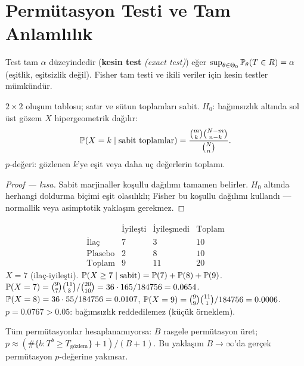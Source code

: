 \section{Permütasyon Testi ve Tam Anlamlılık}
\label{sec:tam_anlamlilik}

\begin{tanim}\label{def:tam_anlamlilik}
Test tam $\alpha$ düzeyindedir (\textbf{kesin test} \emph{(exact test)}) eğer $\sup_{\theta\in\Theta_0}\mathbb{P}_\theta(T\in R) = \alpha$ (eşitlik, eşitsizlik değil). Fisher tam testi ve ikili veriler için kesin testler mümkündür.
\end{tanim}

\begin{teorem}\label{thm:fisher_tam}
$2\times2$ oluşum tablosu; satır ve sütun toplamları sabit. $H_0$: bağımsızlık altında sol üst gözem $X$ hipergeometrik dağılır:
\[
  \mathbb{P}(X=k\mid\text{sabit toplamlar}) = \frac{\binom{m}{k}\binom{N-m}{n-k}}{\binom{N}{n}}.
\]
$p$-değeri: gözlenen $k$'ye eşit veya daha uç değerlerin toplamı.
\end{teorem}

\begin{proof}[Proof --- kısa]
Sabit marjinaller koşullu dağılımı tamamen belirler. $H_0$ altında herhangi doldurma biçimi eşit olasılıklı; Fisher bu koşullu dağılımı kullandı --- normallik veya asimptotik yaklaşım gerekmez.
\end{proof}

\begin{ornek}
\[
\begin{array}{c|cc|c}
 & \text{İyileşti} & \text{İyileşmedi} & \text{Toplam}\\\hline
\text{İlaç} & 7 & 3 & 10 \\
\text{Plasebo} & 2 & 8 & 10 \\\hline
\text{Toplam} & 9 & 11 & 20
\end{array}
\]
$X=7$ (ilaç-iyileşti). $\mathbb{P}(X\geq7\mid\text{sabit})=\mathbb{P}(7)+\mathbb{P}(8)+\mathbb{P}(9)$.
$\mathbb{P}(X=7)=\binom{9}{7}\binom{11}{3}/\binom{20}{10}=36\cdot165/184756=0.0654$.
$\mathbb{P}(X=8)=36\cdot55/184756=0.0107$, $\mathbb{P}(X=9)=\binom{9}{9}\binom{11}{1}/184756=0.0006$.
$p=0.0767>0.05$: bağımsızlık reddedilemez (küçük örneklem).
\end{ornek}

\begin{teorem}\label{thm:mc_permutasyon}
Tüm permütasyonlar hesaplanamıyorsa: $B$ rasgele permütasyon üret; $p\approx(\#\{b:T^b\geq T_{\mathrm{gözlem}}\}+1)/(B+1)$. Bu yaklaşım $B\to\infty$'da gerçek permütasyon $p$-değerine yakınsar.
\end{teorem}

